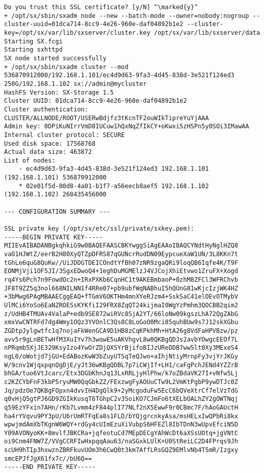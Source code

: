 \begin{lstlisting}
Do you trust this SSL certificate? [y/N] ^\marked{y}^
+ /opt/sx/sbin/sxadm node --new --batch-mode --owner=nobody:nogroup --cluster-uuid=01dca714-8cc9-4e26-960e-daf04892b1e2 --cluster-key=/opt/sx/var/lib/sxserver/cluster.key /opt/sx/var/lib/sxserver/data
Starting SX.fcgi
Starting sxhttpd
SX node started successfully
+ /opt/sx/sbin/sxadm cluster --mod 536870912000/192.168.1.101/ec4d9d63-9fa3-4d45-838d-3e521f124ed3 250G/192.168.1.102 sx://admin@mycluster
HashFS Version: SX-Storage 1.5
Cluster UUID: 01dca714-8cc9-4e26-960e-daf04892b1e2
Cluster authentication:
CLUSTER/ALLNODE/ROOT/USERwBdjfz3tKcnTF2ouWIkTipreYuYjAAA
Admin key: 0DPiKuNIrrVmD8IUCuw1hQxNqZfIkCY+oKwxi5zHSPn5y0SOi3IMawAA
Internal cluster protocol: SECURE
Used disk space: 17568768
Actual data size: 463872
List of nodes:
    - ec4d9d63-9fa3-4d45-838d-3e521f124ed3 192.168.1.101 (192.168.1.101) 536870912000
    * 02e01f5d-80d8-4a01-b1f7-a56eecb8aef5 192.168.1.102 (192.168.1.102) 268435456000

--- CONFIGURATION SUMMARY ---

SSL private key (/opt/sx/etc/ssl/private/sxkey.pem):
-----BEGIN PRIVATE KEY-----
MIIEvAIBADANBgkqhkiG9w0BAQEFAASCBKYwggSiAgEAAoIBAQCYNdtHyNglHZQ8
vaO1HJWtZ/eerB2H80XyQTZpDFRS87qGUNcrRudDN09EypcueXaW1UN/3L8KKn7t
tGhLe6quG8QuKw//UiJDDGTDEICOndtYfBh07zNR9zgaQRi9loqQB6Iqfe4K/T9F
EONMjVji1OF5JI/3SgxEDwoQ4+1eghDuMGMElzJ4VJCojXhiEtvwo1ZruFX+Xogd
rq4Ys6Pch7n9FowdOc2n+IRxPXKb6CqnHC1t9AKEBmbaoP+0zhM8ZFCl3WFRChvb
JF8T9ZZ5q3nol668NILNN1f4RRe07+pb9ubfWqNABhuI5hQUnG81wKjcIzjWK4HZ
+3bMwg6PAgMBAAECggEAQ+fTGmV6OKTHm4mnXYeRJzm4+SskSaC41elOEvOTMybV
UlMCi6YoSo6EaNZROESsKYKfiI29FRX8ZqQT24kijmaI0WgYzPmhm3QOCBB2qim2
z/UdHB4TMUAv4ValaP+edb9SE872wiRVc8SjA2YT/66loNw09kgszLhA72QgZAbG
xmxVwCNTRFd7dg4Wmy1OQz3YVOnlC3Qs8C8LoGoO0Mci85quhBUw9s7J12skXGbu
ZGDtpJylgwtfc1q7nojaFkWenGCA9D1HB8zCqKPkhMh+HtA26g8VdFaHPVBzw/pz
avv5r9gLnBETwHfM3XuIYv7h3wowE5uAKVhgvL8w0QKBgQDJs2avbYOwgcEEOf7L
nPRqmb5XjJE329KsyIzo4YwOrZDjQXSYrBjifoBIJzUReDDB7ww5lt0Xy3MExeS4
ngL0/oWotjd7jGU+EdABozKwW3bZuyUTSqTeQJwo+aIhjNtiyMrnpFy3vjYrJKGy
W/9cnv1WjqxpqnQgDjE/yJt36wKBgQDBL7p7iCWjIf+LH1/caFgPchJENd4YZZrB
bhGA/tuo6VtJcarc/Etx3DGbKhnJq13LxRRLjyHlPhw/k7oZBdaVK27I+vNfw5Lj
c2KZCYbFnF3kbP5ryuMW0QqGbkZZ/FExzwgFyAOUuCTw9L2VmKtPgbP9ywDTJc0Z
Jq/pdzOe7QKBgFOpxn4dvvIH4DgQlk9+2yMcgoduFw5EcC6bQVeXtrCf7elVzTdG
q0vHjQ5gtPJ6GD9ZGIkKusqT6TGhpC2v3SoiKO7CJmFo6tXELbOALhZY2gOWTNqj
q59EzYFxin7AHn/rKb7Lvmm4zF844plI77NLf2nX5EwwF9r0CBmc7F/hAoGAUctH
ha4rYVqvu9PY3pU/U6rUmRTFqEa8s1FLD/bYQjgrcnkyAsa/msHELxIwQPbRi8kx
wpwjmdAmXbTKgnW6WQY+rdGy4cUImEzuXiVubpS6HFEZl8IbTDnN3wUpvEfciN5D
Y09AVONyoKK+8mvlfJBKCRa+jqfeotuCd7MEpDECgYAhWcDt6aXSsUOtq+jgVNtC
oi9Cnm4FNW7Z/VVgCCRFIwHxpqqAau63/naSGxkLUlK+U0StReiLC2D4FPrqs9Jh
scUH9hTIp3hxwznZBRFkuvUOm3h6CwQ0t3km7AffLRsGQZ9EMlvNb4T5mR/Izgxy
smcEPJfJgX61fx7c//bU6Q==
-----END PRIVATE KEY-----



\end{lstlisting}
